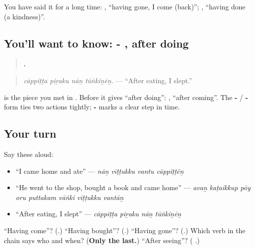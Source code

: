 You have said it for a long time: \textbf{ }, \textquotedblleft{}having gone, I come (back)\textquotedblright{}; \textbf{}, \textquotedblleft{}having done (a kindness)\textquotedblright{}.

\subsection*{You'll want to know: - , after doing}
\begin{quote}
\textbf{   .}
\end{quote}

\begin{quote}
\emph{cāppiṭṭa piṟaku nāṉ tūṅkiṉēṉ.} — \textquotedblleft{}After eating, I slept.\textquotedblright{}
\end{quote}

\textbf{} is the piece you met in \textbf{ }. Before \textbf{} it gives \textquotedblleft{}after doing\textquotedblright{}: \textbf{ }, \textquotedblleft{}after coming\textquotedblright{}. The \textbf{-} / \textbf{-} form ties two actions tightly; \textbf{- } marks a clear step in time.

\subsection*{Your turn}
Say these aloud:

\begin{itemize}
\raggedright
  \item \textquotedblleft{}I came home and ate\textquotedblright{} — \emph{nāṉ vīṭṭukku vantu cāppiṭṭēṉ}
  \item \textquotedblleft{}He went to the shop, bought a book and came home\textquotedblright{} — \emph{avaṉ kaṭaikkup pōy oru puttakam vāṅki vīṭṭukku vantāṉ}
  \item \textquotedblleft{}After eating, I slept\textquotedblright{} — \emph{cāppiṭṭa piṟaku nāṉ tūṅkiṉēṉ}
\end{itemize}

\begin{tcolorbox}[breakable,colback=teal!4,colframe=teal!35!black,title={Before you move on}]
\textquotedblleft{}Having come\textquotedblright{}? (\textbf{}.) \textquotedblleft{}Having bought\textquotedblright{}? (\textbf{}.) \textquotedblleft{}Having gone\textquotedblright{}? (\textbf{}.) Which verb in the chain says who and when? (\textbf{Only the last.}) \textquotedblleft{}After seeing\textquotedblright{}? (\textbf{ }.)
\end{tcolorbox}
